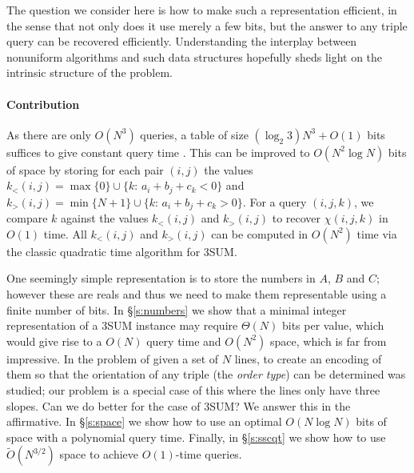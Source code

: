 The question we consider here is how to make such a representation efficient,
in the sense that not only does it use merely a few bits, but the answer to any
triple query can be recovered efficiently. Understanding the interplay between
nonuniform algorithms and such data structures hopefully sheds light on the
intrinsic structure of the problem.

\paragraph{Contribution}

As there are only $O(N^3)$ queries, a table
of size $(\log_2 3) N^3 + O(1)$ bits suffices to give constant query time
\cite{DPT10}. This can be improved to $O(N^2\log N)$ bits of space by
storing for each pair $(i,j)$ the values
\(k_<(i,j) = \max \{ 0\}\cup \{k \colon\, a_i + b_j + c_k < 0\}\) and
\(k_>(i,j) = \min \{ N+1\}\cup \{k \colon\, a_i + b_j + c_k > 0\}\).
For a query \((i,j,k)\), we compare \(k\) against the values \(k_<(i,j)\) and \(k_>(i,j)\)
to recover \(\chi(i,j,k)\) in \(O(1)\) time. All \(k_<(i,j)\) and \(k_>(i,j)\)
can be computed in \(O(N^2)\) time via the classic quadratic time algorithm for
3SUM.

One seemingly simple representation is to store the numbers in $A$, $B$ and
$C$; however these are reals and thus we need to make them representable using
a finite number of bits.
In \S\ref{s:numbers} we show that a minimal integer representation of a
3SUM instance may require $\Theta(N)$ bits per value, which would give
rise to a $O(N)$ query time and $O(N^2)$ space, which is far from
impressive.
In \cite{CCILO19} the problem of given a set of $N$ lines, to create an
encoding of them so that the orientation of any triple (the \emph{order type})
can be determined was studied; our problem is a special case of this where the
lines only have three slopes.
Can we do better for the case of 3SUM? We answer this in the affirmative.
In \S\ref{s:space} we show how to use an optimal $O(N \log N)$ bits of
space with a polynomial query time. Finally, in \S\ref{s:sscqt} we show
how to use $\tilde{O}(N^{3/2})$ space to achieve $O(1)$-time queries.
